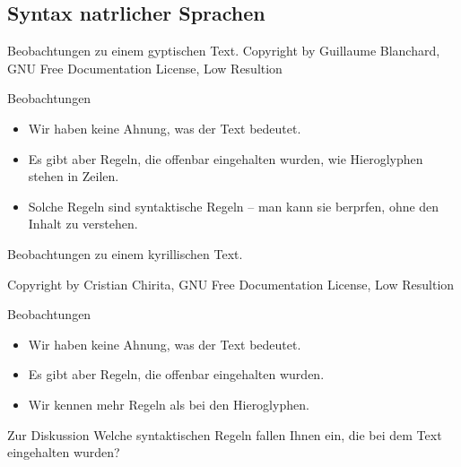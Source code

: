 \subsection[Syntax \protect\\ natrlicher Sprachen]{Syntax natrlicher Sprachen}

\begin{frame}{Beobachtungen zu einem gyptischen Text.}
  {Copyright by Guillaume Blanchard, GNU Free Documentation License, Low Resultion}

  \begin{block}{Beobachtungen}
    \begin{itemize}
    \item Wir haben keine Ahnung, was der Text bedeutet.
    \item Es gibt aber \alert{Regeln}, die offenbar eingehalten wurden,
      wie Hieroglyphen stehen in Zeilen.
    \item Solche Regeln sind \alert{syntaktische Regeln} -- man kann sie
      berprfen, ohne den Inhalt zu verstehen.
    \end{itemize}
  \end{block}
\end{frame}


\begin{frame}{Beobachtungen zu einem kyrillischen Text.}

  {Copyright by Cristian Chirita, GNU Free Documentation License, Low Resultion}

  \begin{block}{Beobachtungen}
    \begin{itemize}
    \item Wir haben keine Ahnung, was der Text bedeutet.
    \item Es gibt aber \alert{Regeln}, die offenbar eingehalten wurden.
    \item Wir kennen mehr Regeln als bei den Hieroglyphen.
    \end{itemize}
  \end{block}

  \begin{block}{Zur Diskussion}
    Welche syntaktischen Regeln fallen Ihnen ein, die bei dem Text
    eingehalten wurden?
  \end{block}
\end{frame}



